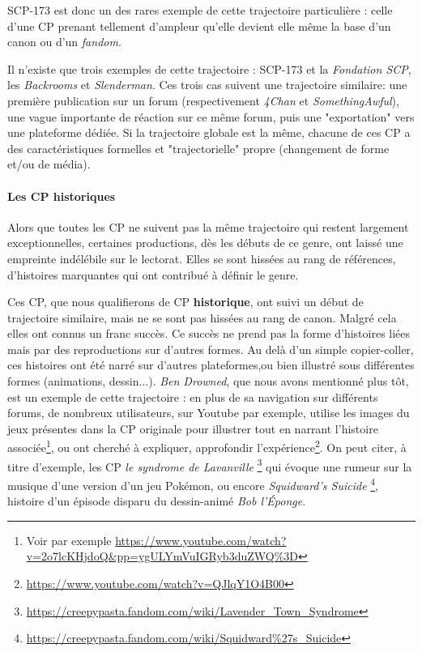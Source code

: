 \documentclass[12pt,a4paper,oneside,titlepage]{article} %
\begin{document}
	SCP-173 est donc un des rares exemple de cette trajectoire particulière : celle d'une CP prenant tellement d'ampleur qu'elle devient elle même la base d'un canon ou d'un \textit{fandom}. 

	
	Il n'existe que trois exemples de cette trajectoire : SCP-173 et la \emph{Fondation SCP}, les \emph{Backrooms} et \emph{Slenderman}. 
	Ces trois cas suivent une trajectoire similaire: une première publication sur un forum (respectivement \emph{4Chan} et \emph{SomethingAwful}), une vague importante de réaction sur ce même forum, puis une "exportation" vers une plateforme dédiée. Si la trajectoire globale est la même, chacune de ces CP a des caractéristiques formelles et "trajectorielle" propre (changement de forme et/ou de média).
	
	\paragraph*{Les CP historiques}
	
	Alors que toutes les CP ne suivent pas la même trajectoire qui restent largement exceptionnelles, certaines productions, dès les débuts de ce genre, ont laissé une empreinte indélébile sur le lectorat. Elles se sont hissées au rang de références, d'histoires marquantes qui ont contribué à définir le genre. 
	
	Ces CP, que nous qualifierons de CP \textbf{historique}, ont suivi un début de trajectoire similaire, mais ne se sont pas hissées au rang de canon. Malgré cela elles ont connus un franc succès. Ce succès ne prend pas la forme d'histoires liées mais par des reproductions sur d'autres formes. Au delà d'un simple copier-coller, ces histoires ont été narré sur d'autres plateformes,ou bien illustré sous différentes formes (animations, dessin...). 
	\textit{Ben Drowned}, que nous avons mentionné plus tôt, est un exemple de cette trajectoire : en plus de sa navigation sur différents forums, de nombreux utilisateurs, sur Youtube par exemple, utilise les images du jeux présentes dans la CP originale pour illustrer tout en narrant l'histoire associée\footnote{Voir par exemple \url{https://www.youtube.com/watch?v=2o7lcKHjdoQ\&pp=ygULYmVuIGRyb3duZWQ\%3D}}, ou ont cherché à expliquer, approfondir l'expérience\footnote{\url{https://www.youtube.com/watch?v=QJlqY1O4B00}}.
	On peut citer, à titre d'exemple, les CP \emph{le syndrome de Lavanville} \footnote{\url{https://creepypasta.fandom.com/wiki/Lavender_Town_Syndrome}} qui évoque une rumeur sur la musique d'une version d'un jeu Pokémon, ou encore \emph{Squidward's Suicide} \footnote{\url{https://creepypasta.fandom.com/wiki/Squidward\%27s_Suicide}}, histoire d'un épisode disparu du dessin-animé \emph{Bob l'Éponge}.
\end{document}
